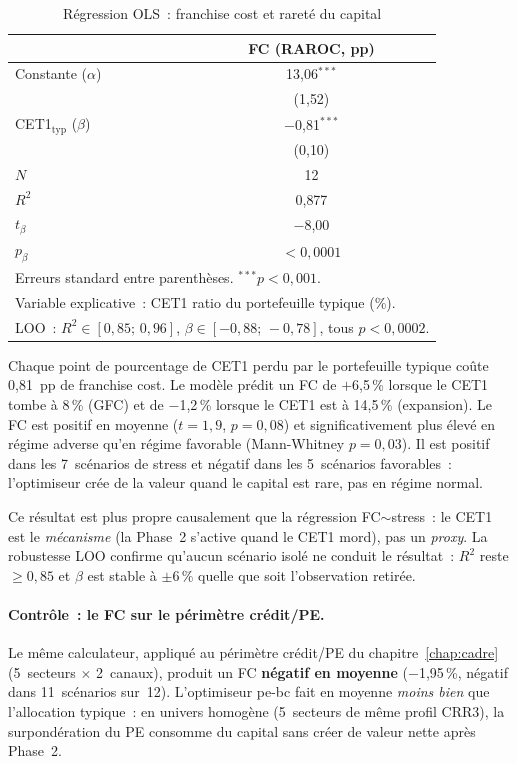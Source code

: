 \documentclass[10pt, a4paper, oneside]{report}
\theoremstyle{definition}
\begin{document}
\begin{table}[htbp]
\centering
\caption{Régression OLS~: franchise cost et rareté du capital}
\label{tab:fc-ols}
\small
\begin{tabular}{lc}
\toprule
 & FC (RAROC, pp) \\
\midrule
Constante ($\alpha$) & 13{,}06$^{***}$ \\
 & \footnotesize{(1{,}52)} \\[6pt]
CET1$_{\text{typ}}$ ($\beta$) & $-$0{,}81$^{***}$ \\
 & \footnotesize{(0{,}10)} \\[6pt]
\midrule
$N$ & 12 \\
$R^2$ & 0{,}877 \\
$t_\beta$ & $-$8{,}00 \\
$p_\beta$ & $< 0{,}0001$ \\
\bottomrule
\multicolumn{2}{l}{\footnotesize{Erreurs standard entre parenthèses. $^{***}p < 0{,}001$.}} \\
\multicolumn{2}{l}{\footnotesize{Variable explicative~: CET1 ratio du portefeuille typique (\%).}} \\
\multicolumn{2}{l}{\footnotesize{LOO~: $R^2 \in [0{,}85 ;\, 0{,}96]$, $\beta \in [-0{,}88 ;\, -0{,}78]$, tous $p < 0{,}0002$.}} \\
\end{tabular}
\end{table}

\noindent Chaque point de pourcentage de CET1 perdu par le portefeuille typique coûte 0{,}81~pp de franchise cost. Le modèle prédit un FC de $+$6{,}5\,\% lorsque le CET1 tombe à 8\,\% (GFC) et de $-$1{,}2\,\% lorsque le CET1 est à 14{,}5\,\% (expansion). Le FC est positif en moyenne ($t = 1{,}9$, $p = 0{,}08$) et significativement plus élevé en régime adverse qu'en régime favorable (Mann-Whitney $p = 0{,}03$). Il est positif dans les 7~scénarios de stress et négatif dans les 5~scénarios favorables~: l'optimiseur crée de la valeur quand le capital est rare, pas en régime normal.

\medskip
Ce résultat est plus propre causalement que la régression FC$\sim$stress~: le CET1 est le \emph{mécanisme} (la Phase~2 s'active quand le CET1 mord), pas un \emph{proxy}. La robustesse LOO confirme qu'aucun scénario isolé ne conduit le résultat~: $R^2$ reste $\geq 0{,}85$ et $\beta$ est stable à $\pm 6\,\%$ quelle que soit l'observation retirée.

\paragraph{Contrôle~: le FC sur le périmètre crédit/PE.} Le même calculateur, appliqué au périmètre crédit/PE du chapitre~\ref{chap:cadre} (5~secteurs $\times$ 2~canaux), produit un FC \textbf{négatif en moyenne} ($-$1{,}95\,\%, négatif dans 11~scénarios sur~12). L'optimiseur pe-bc fait en moyenne \emph{moins bien} que l'allocation typique~: en univers homogène (5~secteurs de même profil CRR3), la surpondération du PE consomme du capital sans créer de valeur nette après Phase~2.
\end{document}
